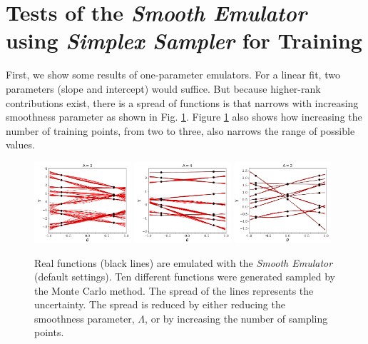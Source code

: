 \documentclass[UserManual.tex]{subfiles}
\begin{document}
\section{Tests of the {\it Smooth Emulator} using {\it Simplex Sampler} for Training}

First, we show some results of one-parameter emulators. For a linear fit, two parameters (slope and intercept) would suffice. But because higher-rank contributions exist, there is a spread of functions is that narrows with increasing smoothness parameter as shown in Fig. \ref{fig:onedim}. Figure \ref{fig:onedim} also shows how increasing the number of training points, from two to three, also narrows the range of possible values. 
\begin{figure}
\includegraphics[width=0.32\textwidth]{onepar2points/onepartest_Lambda2}\hspace*{0.02\textwidth}
\includegraphics[width=0.32\textwidth]{onepar2points/onepartest_Lambda4}\hspace*{0.02\textwidth}
\includegraphics[width=0.32\textwidth]{onepar3points/onepartest_Lambda2}
\caption{\label{fig:onedim}
Real functions (black lines) are emulated with the {\it Smooth Emulator} (default settings). Ten different functions were generated sampled by the Monte Carlo method. The spread of the lines represents the uncertainty. The spread is reduced by either reducing the smoothness parameter, $\Lambda$, or by increasing the number of sampling points.}
\end{figure}
\end{document}
